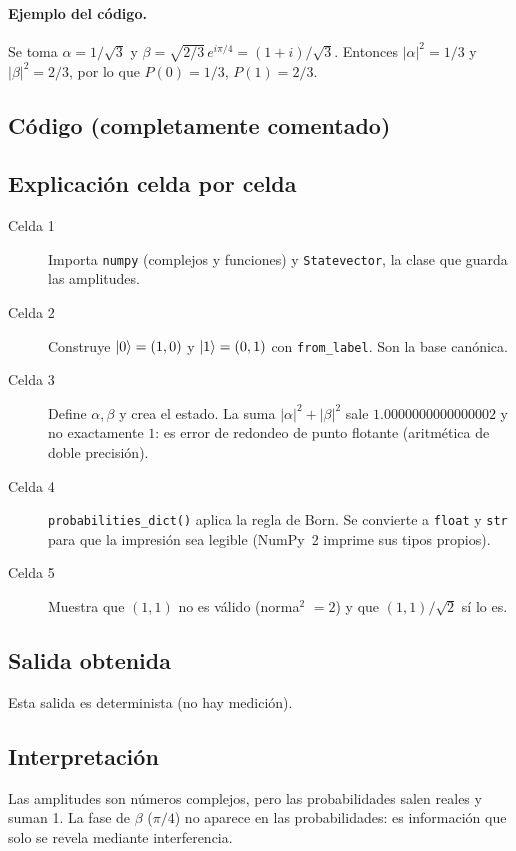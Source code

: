 \paragraph{Ejemplo del código.} Se toma $\alpha=1/\sqrt3$ y
$\beta=\sqrt{2/3}\,e^{i\pi/4}=(1+i)/\sqrt3$. Entonces
$|\alpha|^2=1/3$ y $|\beta|^2=2/3$, por lo que $P(0)=1/3$, $P(1)=2/3$.

\subsection{Código (completamente comentado)}


\subsection{Explicación celda por celda}
\begin{description}
  \item[Celda 1] Importa \texttt{numpy} (complejos y funciones) y
    \texttt{Statevector}, la clase que guarda las amplitudes.
  \item[Celda 2] Construye $\left|0\right\rangle=(1,0)$ y $\left|1\right\rangle=(0,1)$ con
    \texttt{from\_label}. Son la base canónica.
  \item[Celda 3] Define $\alpha,\beta$ y crea el estado. La suma
    $|\alpha|^2+|\beta|^2$ sale $1.0000000000000002$ y no exactamente $1$:
    es error de redondeo de punto flotante (aritmética de doble precisión).
  \item[Celda 4] \texttt{probabilities\_dict()} aplica la regla de Born. Se
    convierte a \texttt{float} y \texttt{str} para que la impresión sea
    legible (NumPy~2 imprime sus tipos propios).
  \item[Celda 5] Muestra que $(1,1)$ no es válido (norma$^2$ $=2$) y que
    $(1,1)/\sqrt2$ sí lo es.
\end{description}

\subsection{Salida obtenida}

Esta salida es determinista (no hay medición).

\subsection{Interpretación}
Las amplitudes son números complejos, pero las probabilidades salen reales y
suman 1. La fase de $\beta$ ($\pi/4$) no aparece en las probabilidades: es
información que solo se revela mediante interferencia.

